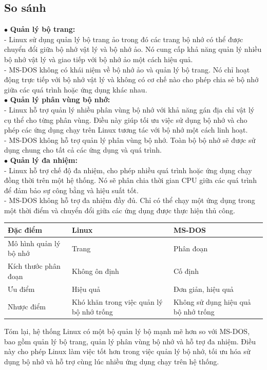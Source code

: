 \documentclass[12pt,a4paper]{article}
\begin{document}
\subsection{So sánh}

$\bullet$ \textbf{Quản lý bộ trang:}\\

- Linux sử dụng quản lý bộ trang ảo trong đó các trang bộ nhớ có thể được chuyển đổi giữa bộ nhớ vật lý và bộ nhớ ảo. Nó cung cấp khả năng quản lý nhiều bộ nhớ vật lý và giao tiếp với bộ nhớ ảo một cách hiệu quả.\\
	
- MS-DOS không có khái niệm về bộ nhớ ảo và quản lý bộ trang. Nó chỉ hoạt động trực tiếp với bộ nhớ vật lý và không có cơ chế nào cho phép chia sẻ bộ nhớ giữa các quá trình hoặc ứng dụng khác nhau. \\
	
$\bullet$ \textbf{Quản lý phân vùng bộ nhớ:}\\

- Linux hỗ trợ quản lý nhiều phân vùng bộ nhớ với khả năng gán địa chỉ vật lý cụ thể cho từng phân vùng. Điều này giúp tối ưu việc sử dụng bộ nhớ và cho phép các ứng dụng chạy trên Linux tương tác với bộ nhớ một cách linh hoạt.\\

- MS-DOS không hỗ trợ quản lý phân vùng bộ nhớ. Toàn bộ bộ nhớ sẽ được sử dụng chung cho tất cả các ứng dụng và quá trình.\\

$\bullet$ \textbf{Quản lý đa nhiệm:}\\

- Linux hỗ trợ chế độ đa nhiệm, cho phép nhiều quá trình hoặc ứng dụng chạy đồng thời trên một hệ thống. Nó sẽ phân chia thời gian CPU giữa các quá trình để đảm bảo sự công bằng và hiệu suất tốt.\\

- MS-DOS không hỗ trợ đa nhiệm đầy đủ. Chỉ có thể chạy một ứng dụng trong một thời điểm và chuyển đổi giữa các ứng dụng được thực hiện thủ công.
\begin{center}
\begin{tabular}{|p{5cm}|p{5.5cm}|p{5.5cm}|}
	\hline 
	Đặc điểm &  Linux &  MS-DOS \\
	\hline 
	Mô hình quản lý bộ nhớ & Trang & Phân đoạn \\
	\hline 
	Kích thước phân đoạn & Không ôn định & Cố định \\
	\hline 
	Ưu điểm & Hiệu quả & Đơn giản, hiệu quả \\
	\hline 
	Nhược điểm & Khó khăn trong việc quản lý bộ nhớ trống & Không sử dụng hiệu quả bộ nhớ trống \\
	\hline 
\end{tabular}
\end{center}
Tóm lại, hệ thống Linux có một bộ quản lý bộ mạnh mẽ hơn so với MS-DOS, bao gồm quản lý bộ trang, quản lý phân vùng bộ nhớ và hỗ trợ đa nhiệm. Điều này cho phép Linux làm việc tốt hơn trong việc quản lý bộ nhớ, tối ưu hóa sử dụng bộ nhớ và hỗ trợ cùng lúc nhiều ứng dụng chạy trên hệ thống. 
\end{document}
